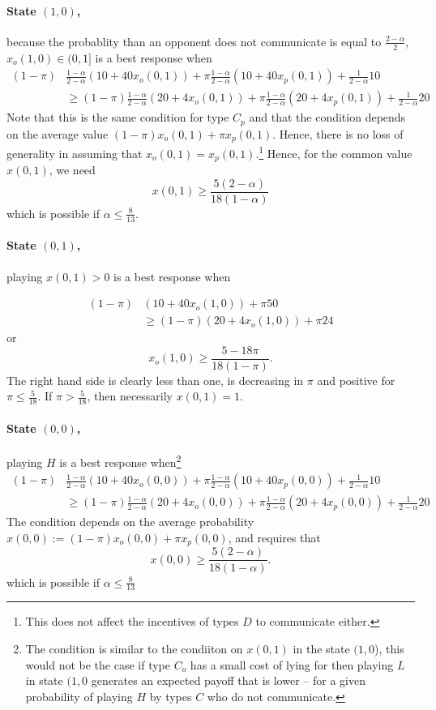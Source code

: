 \documentclass[12pt]{article}
\theoremstyle{break}
\begin{document}
\paragraph{State $(1,0)$,} because the probablity than an opponent does not communicate is equal to $\frac{2-\alpha}{2}$, $x_o(1,0)\in(0,1]$ is a best response when
\begin{align*}
	(1-\pi)&\frac{1-\alpha}{2-\alpha} (10+40x_o(0,1))+\pi \frac{1-\alpha}{2-\alpha}(10+40 x_p(0,1))+\frac{1}{2-\alpha}10\\
		&\geq (1-\pi)\frac{1-\alpha}{2-\alpha} (20+4x_o(0,1))+\pi \frac{1-\alpha}{2-\alpha}(20+4 x_p(0,1)) +\frac{1}{2-\alpha}20
\end{align*}
Note that this is the same condition for type $C_p$ and that the condition depends on the average value $(1-\pi)x_o(0,1)+\pi x_p(0,1)$. Hence, there is no loss of generality in assuming that $x_o(0,1)=x_p(0,1)$.\footnote{%
This does not affect the incentives of types $D$ to communicate either.} Hence, for the common value $x(0,1)$, we need
\[
x(0,1)\geq\frac{5(2-\alpha)}{18(1-\alpha)}
\]
which is possible if $\alpha\leq \frac{8}{13}.$

\paragraph{State $(0,1)$,} playing $x(0,1)>0$ is a best response when

\begin{align*}
	(1-\pi) &(10+40x_o(1,0))+\pi 50\\
		&\geq(1-\pi) (20+4x_o(1,0))+\pi  24
\end{align*}
or
\[
x_o(1,0)\geq\frac{5-18\pi}{18(1-\pi)}.
\]
The right hand side is clearly less than one, is decreasing in $\pi$ and positive for $\pi\leq\frac{5}{18}$. If $\pi>\frac{5}{18}$, then necessarily $x(0,1)=1$.

\paragraph{State $(0,0)$,} playing $H$ is a best response when\footnote{%
The condition is similar to the condiiton on $x(0,1)$ in the state $(1,0$),  this would not be the case if type $C_o$ has a small cost of lying for then playing $L$ in state $(1,0$ generates an expected payoff that is lower -- for a given probability of playing $H$ by types $C$ who do not communicate.}
\begin{align*}
	(1-\pi)&\frac{1-\alpha}{2-\alpha} (10+40x_o(0,0))+\pi \frac{1-\alpha}{2-\alpha}(10+40 x_p(0,0))+\frac{1}{2-\alpha}10\\
		&\geq  (1-\pi)\frac{1-\alpha}{2-\alpha} (20+4x_o(0,0))+\pi \frac{1-\alpha}{2-\alpha}(20+4 x_p(0,0)) +\frac{1}{2-\alpha}20
\end{align*}
The condition depends on the average probability $x(0,0):=(1-\pi)x_o(0,0)+\pi x_p(0,0)$, and requires that
\[
x(0,0)\geq \frac{5(2-\alpha)}{18(1-\alpha)}.
\]
which is possible if $\alpha\leq \frac{8}{13}$
\end{document}
